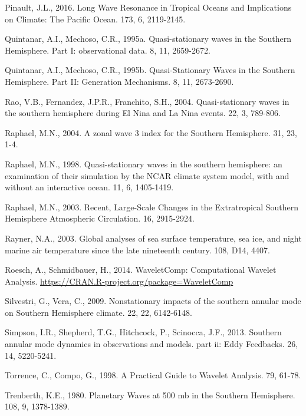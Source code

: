 \documentclass[spanish,a4paper,12pt]{book}
\begin{document}
\hypertarget{ref-Pinault2016}{}
Pinault, J.L., 2016. Long Wave Resonance in Tropical Oceans and
Implications on Climate: The Pacific Ocean. 173, 6, 2119-2145.

\hypertarget{ref-Quintanar1995a}{}
Quintanar, A.I., Mechoso, C.R., 1995a. Quasi-stationary waves in the
Southern Hemisphere. Part I: observational data. 8, 11, 2659-2672.

\hypertarget{ref-Quintanar1995}{}
Quintanar, A.I., Mechoso, C.R., 1995b. Quasi-Stationary Waves in the
Southern Hemisphere. Part II: Generation Mechanisms. 8, 11, 2673-2690.

\hypertarget{ref-Rao2004}{}
Rao, V.B., Fernandez, J.P.R., Franchito, S.H., 2004. Quasi-stationary
waves in the southern hemisphere during El Nina and La Nina events. 22,
3, 789-806.

\hypertarget{ref-Raphael2004}{}
Raphael, M.N., 2004. A zonal wave 3 index for the Southern Hemisphere.
31, 23, 1-4.

\hypertarget{ref-Raphael1998}{}
Raphael, M.N., 1998. Quasi-stationary waves in the southern hemisphere:
an examination of their simulation by the NCAR climate system model,
with and without an interactive ocean. 11, 6, 1405-1419.

\hypertarget{ref-Raphael2003}{}
Raphael, M.N., 2003. Recent, Large-Scale Changes in the Extratropical
Southern Hemisphere Atmospheric Circulation. 16, 2915-2924.

\hypertarget{ref-Rayner2003}{}
Rayner, N.A., 2003. Global analyses of sea surface temperature, sea ice,
and night marine air temperature since the late nineteenth century. 108,
D14, 4407.

\hypertarget{ref-R-WaveletComp}{}
Roesch, A., Schmidbauer, H., 2014. WaveletComp: Computational Wavelet
Analysis. \url{https://CRAN.R-project.org/package=WaveletComp}

\hypertarget{ref-Silvestri2009}{}
Silvestri, G., Vera, C., 2009. Nonstationary impacts of the southern
annular mode on Southern Hemisphere climate. 22, 22, 6142-6148.

\hypertarget{ref-Simpson2013}{}
Simpson, I.R., Shepherd, T.G., Hitchcock, P., Scinocca, J.F., 2013.
Southern annular mode dynamics in observations and models. part ii: Eddy
Feedbacks. 26, 14, 5220-5241.

\hypertarget{ref-Torrence1998}{}
Torrence, C., Compo, G., 1998. A Practical Guide to Wavelet Analysis.
79, 61-78.

\hypertarget{ref-Trenberth1980a}{}
Trenberth, K.E., 1980. Planetary Waves at 500 mb in the Southern
Hemisphere. 108, 9, 1378-1389.
\end{document}
